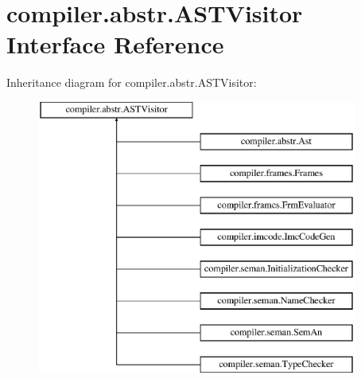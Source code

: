 \hypertarget{interfacecompiler_1_1abstr_1_1_a_s_t_visitor}{}\section{compiler.\+abstr.\+A\+S\+T\+Visitor Interface Reference}
\label{interfacecompiler_1_1abstr_1_1_a_s_t_visitor}
Inheritance diagram for compiler.\+abstr.\+A\+S\+T\+Visitor\+:\begin{figure}[H]
\begin{center}
\leavevmode
\includegraphics[height=9.000000cm]{interfacecompiler_1_1abstr_1_1_a_s_t_visitor}
\end{center}
\end{figure}
